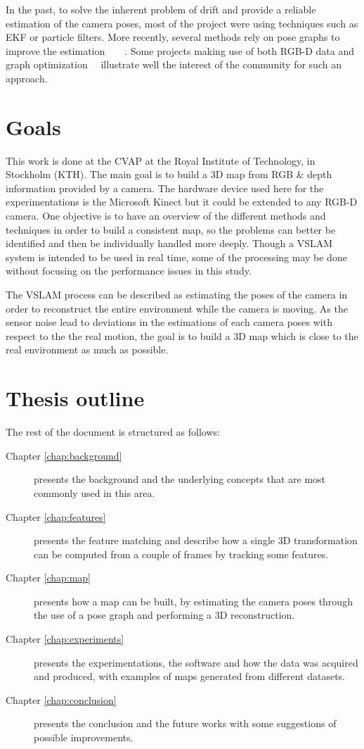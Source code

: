 In the past, to solve the inherent problem of drift and provide a reliable estimation of the camera poses, most of the project were using techniques such as \gls{EKF} or particle filters. More recently, several methods rely on pose graphs to improve the estimation~\cite{Thrun05_GraphSLAM}~\cite{grisetti07rss}~\cite{g2o_2011}~\cite{hogman_2010}. Some projects making use of both RGB-D data and graph optimization~\cite{Henry_RGBD_2010}~\cite{engelhard11euron-workshop} illustrate well the interest of the community for such an approach.

\section{Goals}

This work is done at the \gls{CVAP} at the Royal Institute of Technology, in Stockholm (KTH). The main goal is to build a 3D map from RGB \& depth information provided by a camera. The hardware device used here for the experimentations is the Microsoft Kinect but it could be extended to any RGB-D camera. One objective is to have an overview of the different methods and techniques in order to build a consistent map, so the problems can better be identified and then be individually handled more deeply. Though a \gls{VSLAM} system is intended to be used in real time, some of the processing may be done without focusing on the performance issues in this study. 

The \gls{VSLAM} process can be described as estimating the poses of the camera in order to reconstruct the entire environment while the camera is moving. As the sensor noise lead to deviations in the estimations of each camera poses with respect to the the real motion, the goal is to build a 3D map which is close to the real environment as much as possible.

\clearpage
\section{Thesis outline}

The rest of the document is structured as follows:
\begin{description}
\item[Chapter \ref{chap:background}] presents the background and the underlying concepts that are most commonly used in this area.
\item[Chapter \ref{chap:features}] presents the feature matching and describe how a single 3D transformation can be computed  from a couple of frames by tracking some features.
\item[Chapter \ref{chap:map}] presents how a map can be built, by estimating the camera poses through the use of a pose graph and performing a 3D reconstruction.
\item[Chapter \ref{chap:experiments}] presents the experimentations, the software and how the data was acquired and produced, with examples of maps generated from different datasets.
\item[Chapter \ref{chap:conclusion}] presents the conclusion and the future works with some suggestions of possible improvements.
\end{description}

